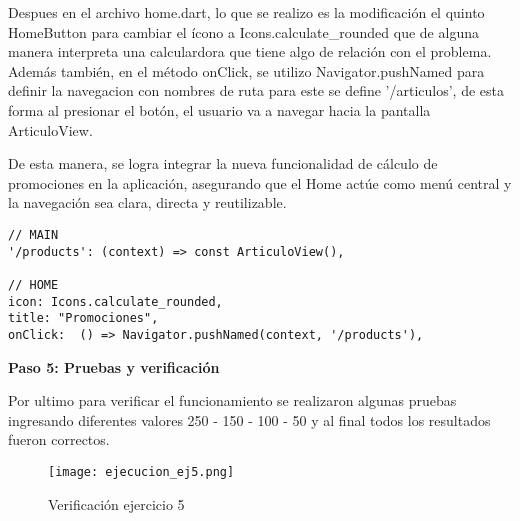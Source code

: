 Despues en el archivo home.dart, lo que se realizo es la modificación el quinto HomeButton para cambiar el ícono a Icons.calculate\_rounded que de alguna manera interpreta una calculardora que tiene algo de relación con el problema. Además también, en el método onClick, se utilizo Navigator.pushNamed para definir la navegacion con nombres de ruta para este se define '/articulos', de esta forma al presionar el botón, el usuario va a navegar hacia la pantalla ArticuloView.

De esta manera, se logra integrar la nueva funcionalidad de cálculo de promociones en la aplicación, asegurando que el Home actúe como menú central y la navegación sea clara, directa y reutilizable.


\begin{center}
\begin{lstlisting}
// MAIN
'/products': (context) => const ArticuloView(),

// HOME  
icon: Icons.calculate_rounded,
title: "Promociones",
onClick:  () => Navigator.pushNamed(context, '/products'),
\end{lstlisting}
\end{center}

\textbf{Paso 5: Pruebas y verificación}

Por ultimo para verificar el funcionamiento se realizaron algunas pruebas ingresando diferentes valores 250 - 150 - 100 - 50 y al final todos los resultados fueron correctos.

\begin{figure}[H]
    \centering
    \texttt{[image: ejecucion\_ej5.png]}
    \caption{Verificación ejercicio 5}
    \label{fig:ej5_ejecuccion}
\end{figure}
